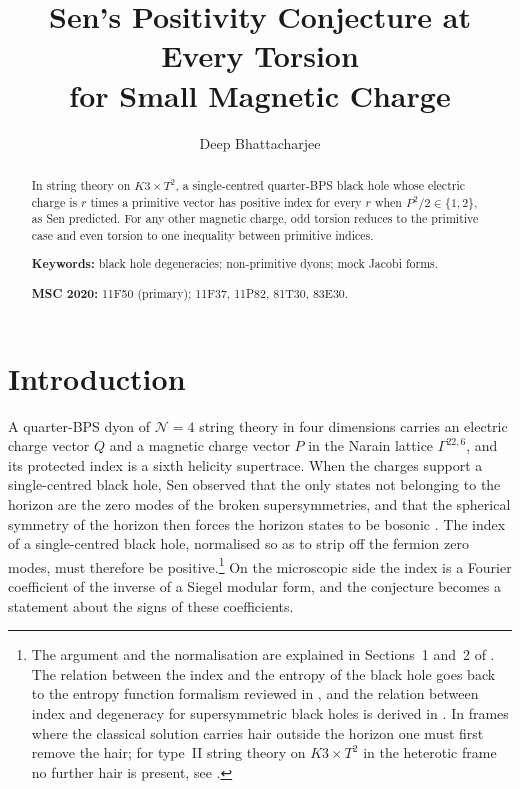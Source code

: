\documentclass[11pt]{amsart}
\theoremstyle{definition}
\begin{document}
\title[Sen's positivity at every torsion]{Sen's Positivity Conjecture at Every Torsion\\ for Small Magnetic Charge}

\author{Deep Bhattacharjee}
\address{Formerly, Electro-Gravitational Space Propulsion Laboratory (EGSPL), Bhubaneswar, Odisha 751030, India}
\address{Formerly, University of Calcutta (Heramba Chandra College), 23/49 Gariahat Road, Golpark, Kolkata 700029, West Bengal, India}

\begin{abstract}
In string theory on $K3\times T^2$, a single-centred quarter-BPS black hole whose electric charge is $r$ times a primitive vector has positive index for every $r$ when $P^2/2\in\{1,2\}$, as Sen predicted. For any other magnetic charge, odd torsion reduces to the primitive case and even torsion to one inequality between primitive indices.

\medskip\noindent\textbf{Keywords:} black hole degeneracies; non-primitive dyons; mock Jacobi forms.

\smallskip\noindent\textbf{MSC 2020:} 11F50 (primary); 11F37, 11P82, 81T30, 83E30.
\end{abstract}

\maketitle

\section{Introduction}\label{sec:intro}
\enlargethispage{4pt}

A quarter-BPS dyon of $\mathcal N=4$ string theory in four dimensions carries an electric charge vector $Q$ and a magnetic charge vector $P$ in the Narain lattice $\Gamma^{22,6}$, and its protected index is a sixth helicity supertrace. When the charges support a single-centred black hole, Sen observed that the only states not belonging to the horizon are the zero modes of the broken supersymmetries, and that the spherical symmetry of the horizon then forces the horizon states to be bosonic \cite{Sen11}. The index of a single-centred black hole, normalised so as to strip off the fermion zero modes, must therefore be positive.\footnote{The argument and the normalisation are explained in Sections~1 and~2 of \cite{Sen11}. The relation between the index and the entropy of the black hole goes back to the entropy function formalism reviewed in \cite{Sen08}, and the relation between index and degeneracy for supersymmetric black holes is derived in \cite{DGMS11}. In frames where the classical solution carries hair outside the horizon one must first remove the hair; for type~II string theory on $K3\times T^2$ in the heterotic frame no further hair is present, see \cite{CD21}.} On the microscopic side the index is a Fourier coefficient of the inverse of a Siegel modular form, and the conjecture becomes a statement about the signs of these coefficients.
\end{document}
